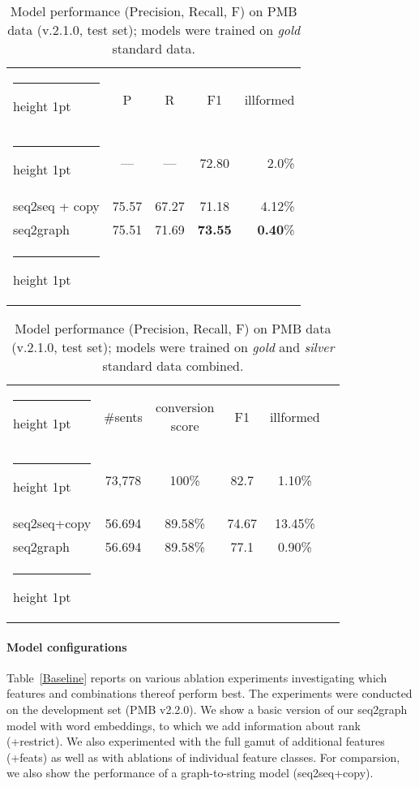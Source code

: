 \documentclass[11pt,a4paper]{article}
\makeatletter
\theoremstyle{plain}
\newcommand{\thickhline}{\noalign {\ifnum 0=`}\fi \hrule height 1pt
    \futurelet \reserved@a \@xhline
}
\makeatother
\begin{document}
\begin{table}[t]
\begin{center}
\begin{small}
\begin{tabular}{@{}l@{~~}cccr@{}} \thickhline
 & P & R & F1 & illformed\\
\thickhline
 \citet{van2018exploring} & --- & --- & 72.80 & 2.0\%\\
seq2seq + copy & 75.57 & 67.27 & 71.18 & 4.12\%\\
seq2graph & 75.51 & 71.69 & {\bf 73.55} & {\bf 0.40}\%\\\thickhline
\end{tabular}
\end{small}
\caption{Model performance (Precision, Recall, F) on PMB data
  (v.2.1.0, test set); models were trained on \emph{gold} standard data.}
\label{baseline_comp}
\end{center}
\end{table}

\begin{table}[t]
\begin{center}
\begin{small}
\begin{tabular}{@{}l@{~~~}c@{~~}c@{~}c@{~~}c@{~~}c@{}} \thickhline
& \#sents & \shortstack{conversion\\score} & F1 & illformed\\
\thickhline
\citet{van2018exploring} & 73,778 & 100\% & 82.7 & 1.10\%\\
seq2seq+copy & 56.694 & 89.58\% & 74.67 & 13.45\%\\
seq2graph & 56.694 & 89.58\% & 77.1 & 0.90\%\\ \thickhline
\end{tabular}
\end{small}
\caption{Model performance (Precision, Recall, F) on PMB data
  (v.2.1.0, test set); models were trained on \emph{gold} and
  \emph{silver} standard data combined.}
\label{silveren}
\end{center}
\end{table}

\paragraph{Model configurations}
Table~\ref{Baseline} reports on various ablation experiments investigating which features and combinations thereof perform best. The experiments were conducted on the
development set (PMB v2.2.0). We show a basic version of our seq2graph
model with word embeddings, to which we add information about rank (+restrict). We also experimented with the
full gamut of additional features (+feats) as well as with ablations
of individual feature classes. For comparsion, we also show the
performance of a graph-to-string model (seq2seq+copy).
\end{document}
